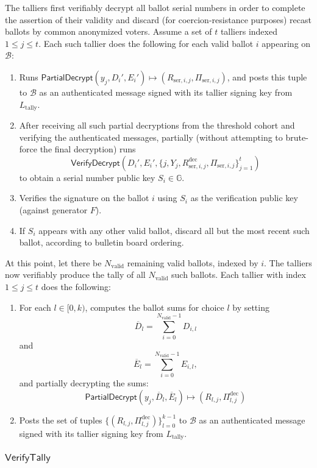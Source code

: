 \documentclass{llncs}
\newcommand{\G}{\mathbb{G}}
\newcommand{\func}[1]{\mathsf{#1}}
\begin{document}
The talliers first verifiably decrypt all ballot serial numbers in order to complete the assertion of their validity and discard (for coercion-resistance purposes) recast ballots by common anonymized voters.
Assume a set of $t$ talliers indexed $1 \leq j \leq t$.
Each such tallier does the following for each valid ballot $i$ appearing on $\mathcal{B}$:
\begin{enumerate}
    \item Runs $\func{PartialDecrypt}(y_j, D_i', E_i') \mapsto (R_{\text{ser},i,j}, \Pi_{\text{ser},i,j})$, and posts this tuple to $\mathcal{B}$ as an authenticated message signed with its tallier signing key from $L_{\text{tally}}$.
    \item After receiving all such partial decryptions from the threshold cohort and verifying the authenticated messages, partially (without attempting to brute-force the final decryption) runs \[ \func{VerifyDecrypt}(D_i', E_i', \{j, Y_j, R_{\text{ser},i,j}^{\text{dec}}, \Pi_{\text{ser},i,j}\}_{j=1}^t) \] to obtain a serial number public key $S_i \in \G$.
    \item Verifies the signature on the ballot $i$ using $S_i$ as the verification public key (against generator $F$).
    \item If $S_i$ appears with any other valid ballot, discard all but the most recent such ballot, according to bulletin board ordering.
\end{enumerate}

At this point, let there be $N_{\text{valid}}$ remaining valid ballots, indexed by $i$.
The talliers now verifiably produce the tally of all $N_{\text{valid}}$ such ballots.
Each tallier with index $1 \leq j \leq t$ does the following:
\begin{enumerate}
    \item For each $l \in [0,k)$, computes the ballot sums for choice $l$ by setting \[ \overline{D}_l = \sum_{i=0}^{N_{\text{valid}}-1} D_{i,l} \] and \[ \overline{E}_l = \sum_{i=0}^{N_{\text{valid}}-1} E_{i,l}, \] and partially decrypting the sums:
    \[ \func{PartialDecrypt}(y_j, \overline{D}_l, \overline{E}_l) \mapsto (R_{l,j},\Pi_{l,j}^{\text{dec}}) \]
    \item Posts the set of tuples $\{(R_{l,j},\Pi_{l,j}^{\text{dec}})\}_{l=0}^{k-1}$ to $\mathcal{B}$ as an authenticated message signed with its tallier signing key from $L_{\text{tally}}$.
\end{enumerate}


\subsubsection{\texorpdfstring{$\func{VerifyTally}$}{VerifyTally}}
\end{document}
